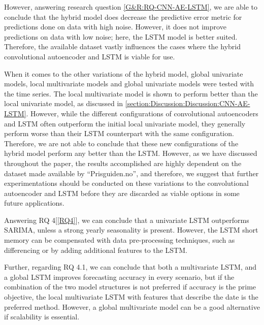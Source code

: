 However, answering research question \cref{G&R:RQ-CNN-AE-LSTM}, we are able to conclude that the hybrid model does
decrease the predictive error metric for predictions done on data with high noise.
However, it does not improve predictions on data with low noise; here, the LSTM model is better suited.
Therefore, the available dataset vastly influences the cases where the hybrid convolutional autoencoder and LSTM is viable for use.

When it comes to the other variations of the hybrid model, global univariate models,
local multivariate models and global univariate models were tested with the time series.
The local multivariate model is shown to perform better than the local univariate model, as discussed in \cref{section:Discussion:Discussion:CNN-AE-LSTM}.
However, while the different configurations of convolutional autoencoders and LSTM often outperform the initial local univariate model,
they generally perform worse than their LSTM counterpart with the same configuration.
Therefore, we are not able to conclude that these new configurations of the hybrid model perform any better than the LSTM.
However, as we have discussed throughout the paper, the results accomplished are highly dependent on the dataset made available by ``Prisguiden.no'',
and therefore, we suggest that further experimentations should be conducted on these variations to the convolutional autoencoder and LSTM
before they are discarded as viable options in some future applications.



Answering RQ 4[\ref{RQ4}], we can conclude that a univariate LSTM outperforms SARIMA,
unless a strong yearly seasonality is present. However, the LSTM short memory can be
compensated with data pre-processing techniques, such as differencing or by adding
additional features to the LSTM.

Further, regarding RQ 4.1, we can conclude that both a multivariate LSTM,
and a global LSTM improves forecasting accuracy in every scenario, but if the combination
of the two model structures is not preferred if accuracy is the prime objective,
the local multivariate LSTM with features that describe the date is the preferred method.
However, a global multivariate model can be a good alternative if scalability is essential.

